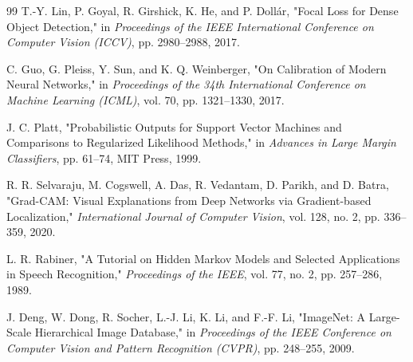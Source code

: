 \documentclass[12pt,a4paper]{report}
\begin{document}
\begin{thebibliography}{99}
 T.-Y. Lin, P. Goyal, R. Girshick, K. He, and P. Dollár, "Focal Loss for Dense Object Detection," in \textit{Proceedings of the IEEE International Conference on Computer Vision (ICCV)}, pp. 2980--2988, 2017.

 C. Guo, G. Pleiss, Y. Sun, and K. Q. Weinberger, "On Calibration of Modern Neural Networks," in \textit{Proceedings of the 34th International Conference on Machine Learning (ICML)}, vol. 70, pp. 1321--1330, 2017.

 J. C. Platt, "Probabilistic Outputs for Support Vector Machines and Comparisons to Regularized Likelihood Methods," in \textit{Advances in Large Margin Classifiers}, pp. 61--74, MIT Press, 1999.

 R. R. Selvaraju, M. Cogswell, A. Das, R. Vedantam, D. Parikh, and D. Batra, "Grad-CAM: Visual Explanations from Deep Networks via Gradient-based Localization," \textit{International Journal of Computer Vision}, vol. 128, no. 2, pp. 336--359, 2020.

 L. R. Rabiner, "A Tutorial on Hidden Markov Models and Selected Applications in Speech Recognition," \textit{Proceedings of the IEEE}, vol. 77, no. 2, pp. 257--286, 1989.

 J. Deng, W. Dong, R. Socher, L.-J. Li, K. Li, and F.-F. Li, "ImageNet: A Large-Scale Hierarchical Image Database," in \textit{Proceedings of the IEEE Conference on Computer Vision and Pattern Recognition (CVPR)}, pp. 248--255, 2009.

\end{thebibliography}
\end{document}

